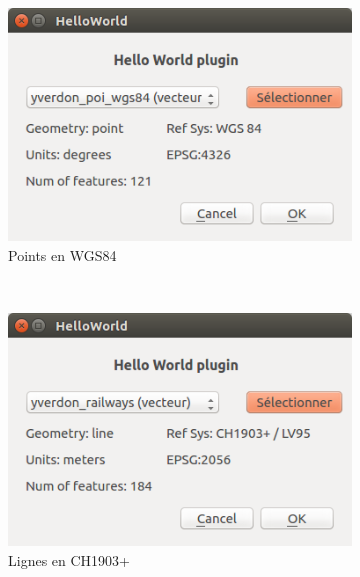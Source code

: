 \documentclass[11pt]{article}
\begin{document}
\begin{enumerate}
\vspace*{-0em}
\hspace*{-8em}
\begin{minipage}[t]{0.9\paperwidth}
\begin{figure}[H]
    \centering
    \begin{subfigure}[t]{0.44\textwidth}
		\centering
        \includegraphics[width=1\textwidth]{plugintest1_4.png}
		\caption{Points en WGS84}\label{plugintest:1}
    \end{subfigure}%
    ~
    \begin{subfigure}[t]{0.44\textwidth}
        \centering
        \includegraphics[width=1\textwidth]{plugintest3_4.png}
        \caption{Lignes en CH1903+}\label{plugintest:2}
    \end{subfigure}
    \\
    \begin{subfigure}[t]{0.44\textwidth}

\end{subfigure}
\end{figure}
\end{minipage}
\end{enumerate}
\end{document}
